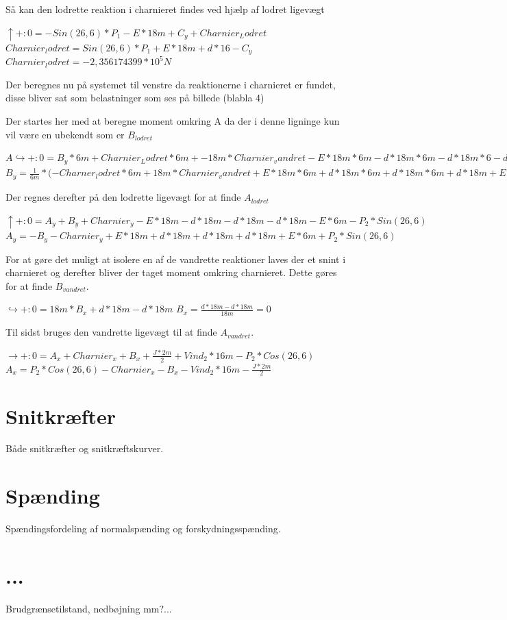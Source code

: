 Så kan den lodrette reaktion i charnieret findes ved hjælp af lodret ligevægt
\begin{center}
	$\uparrow+:0=-Sin(26,\!6)*P_1-E*18m+C_y+Charnier_Lodret$
	$Charnier_lodret=Sin(26,\!6)*P_1+E*18m+d*16-C_y$
	$Charnier_lodret=-2,\!356174399*10^5N$
\end{center}

Der beregnes nu på systemet til venstre da reaktionerne i charnieret er fundet, disse bliver sat som belastninger som ses på billede (blabla 4)


Der startes her med at beregne moment omkring A da der i denne ligninge kun vil være en ubekendt som er $B_{lodret}$  
\begin{center}
	$A\hookrightarrow+:0=B_y*6m+Charnier_Lodret*6m+-18m*Charnier_vandret-E*18m*6m-d*18m*6m-d*18m*6-d-18m-E*6m*\frac{6}{2}+P_2*Cos(26,\!6)*18m-Vind_2*18m*(\frac{16}{2}m+2m)-\frac{J*2m}{2}*(\frac{2m}{2})$
	$B_y=\frac{1}{6m}*(-Charner_lodret*6m+18m*Charnier_vandret+E*18m*6m+d*18m*6m+d*18m*6m+d*18m+E*6m*\frac{6}{2}m-P_2*Cos(26,\!6)*18m+Vind_2*18m*(8m+2m+\frac{J*2m}{2}*\frac{2m}{2})$
\end{center}

Der regnes derefter på den lodrette ligevægt for at finde $A_{lodret}$
\begin{center}
	$\uparrow+:0=A_y+B_y+Charnier_y-E*18m-d*18m-d*18m-d*18m-E*6m-P_2*Sin(26,\!6)$
	$A_y=-B_y-Charnier_y+E*18m+d*18m+d*18m+d*18m+E*6m+P_2*Sin(26,\!6)$
\end{center}

For at gøre det muligt at isolere en af de vandrette reaktioner laves der et snint i charnieret og derefter bliver der taget moment omkring charnieret. Dette gøres for at finde $B_{vandret}$.
\begin{center}
	$\hookrightarrow+:0=18m*B_x+d*18m-d*18m$
	$B_x=\frac{d*18m-d*18m}{18m}=0$
\end{center}

Til sidst bruges den vandrette ligevægt til at finde $A_{vandret}$.
\begin{center}
	$\rightarrow+:0=A_x+Charnier_x+B_x+\frac{J*2m}{2}+Vind_2*16m-P_2*Cos(26,\!6)$
	$A_x=P_2*Cos(26,\!6)-Charnier_x-B_x-Vind_2*16m-\frac{J*2m}{2}$
\end{center} 
 
\section{Snitkræfter}
Både snitkræfter og snitkræftskurver.

\section{Spænding}
Spændingsfordeling af normalspænding og forskydningsspænding.

\section{...}
Brudgrænsetilstand, nedbøjning mm?...